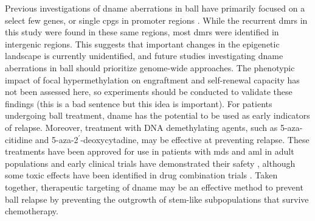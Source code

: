 Previous investigations of \gls{dname} aberrations in \gls{ball} have primarily focused on a select few genes, or single \glspl{cpg} in promoter regions \cite{nordlundGenomewideSignaturesDifferential2013,leeEpigeneticRemodelingBcell2015,garcia-maneroDNAMethylationMultiple2002,garcia-maneroAberrantDNAMethylation2003}.
While the recurrent \glspl{dmr} in this study were found in these same regions, most \glspl{dmr} were identified in intergenic regions.
This suggests that important changes in the epigenetic landscape is currently unidentified, and future studies investigating \gls{dname} aberrations in \gls{ball} should prioritize genome-wide approaches.
The phenotypic impact of focal hypermethylation on engraftment and self-renewal capacity has not been assessed here, so experiments should be conducted to validate these findings (this is a bad sentence but this idea is important).
For patients undergoing \gls{ball} treatment, \gls{dname} has the potential to be used as early indicators of relapse.
Moreover, treatment with DNA demethylating agents, such as 5-aza-citidine and 5-aza-2$^\prime$-deoxycytadine, may be effective at preventing relapse.
These treatments have been approved for use in patients with \gls{mds} and \gls{aml} in adult populations and early clinical trials have demonstrated their safety \cite{bentonSafetyClinicalActivity2014,nationalcancerinstitutenciGroupwidePilotStudy2021}, although some toxic effects have been identified in drug combination trials \cite{therapeuticadvancesinchildhoodleukemiaconsortiumPilotStudyDecitabine2020}.
Taken together, therapeutic targeting of \gls{dname} may be an effective method to prevent \gls{ball} relapse by preventing the outgrowth of stem-like subpopulations that survive chemotherapy.
